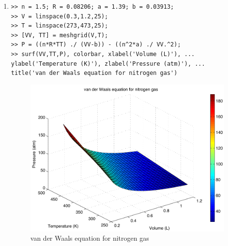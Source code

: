 \begin{enumerate}
\clearpage
\item
\begin{lstlisting}
>> n = 1.5; R = 0.08206; a = 1.39; b = 0.03913;
>> V = linspace(0.3,1.2,25);
>> T = linspace(273,473,25);
>> [VV, TT] = meshgrid(V,T);
>> P = ((n*R*TT) ./ (VV-b)) - ((n^2*a) ./ VV.^2);
>> surf(VV,TT,P), colorbar, xlabel('Volume (L)'), ...
ylabel('Temperature (K)'), zlabel('Pressure (atm)'), ...
title('van der Waals equation for nitrogen gas')
\end{lstlisting}
\begin{figure}[h]
	\myfloatalign
	\includegraphics[width=\linewidth]{Graphics/Additional-Ex/3D-vdW-nitrogen-plot}
	\caption{van der Waals equation for nitrogen gas}
	\label{fig:3D-vdW-nitrogen-plot}
\end{figure}


\end{enumerate}
